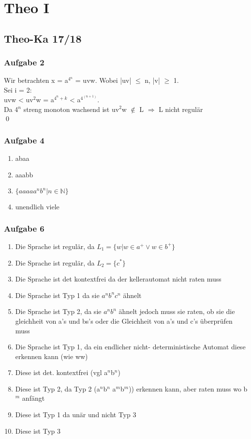 \documentclass[12pt]{scrartcl}
\begin{document}
	
\section{Theo I}
\subsection{Theo-Ka 17/18}
	
\subsubsection{Aufgabe 2}
	Wir betrachten x = a$^{4{^n}}$ = uvw. Wobei |uv| $\le$ n, |v| $\ge$ 1. \\
	Sei i = 2:\\
	uvw < uv$^{2}$w = a$^{4^{n}+k}$ <  a$^{4^{(n+1)}}$. \\
	Da 4$^{n}$ streng monoton wachsend ist uv$^{2}$w $\notin$ L $\Rightarrow$ L nicht regulär \\
	\qed
\subsubsection{Aufgabe 4}
	\begin{enumerate}
		\item abaa
		\item aaabb
		\item \(\{aaaaa^{n}b^{n}|n\in \mathbb{N}\}\)
		\item unendlich viele 
	\end{enumerate}
\subsubsection{Aufgabe 6}
	\begin{enumerate}
	
		\item Die Sprache ist regulär, da \(L_1 = \{w | w \in a^{+} \lor w \in b^{+} \} \)
		\item Die Sprache ist regulär, da \( L_2 = \{c^{*} \} \)
		\item Die Sprache ist det kontextfrei da der kellerautomat nicht raten muss 
		\item Die Sprache ist Typ 1 da sie \( a^{n} b^{n} c^{n} \) ähnelt
		\item Die Sprache ist Typ 2, da sie \(a^{n} b^{n} \) ähnelt jedoch muss sie raten, ob sie die gleichheit von a's und  bs's oder die Gleichheit von a's und c's überprüfen muss
		\item Die Sprache ist Typ 1, da ein endlicher nicht- deterministische Automat diese erkennen kann (wie ww)
		\item Diese ist det. kontextfrei (vgl a$^{n}$b$^{n}$)
		\item Diese ist Typ 2, da Typ 2 (a$^{n}$b$^{n}$ a$^{m}$b$^{m}$)) erkennen kann, aber raten muss wo b$^{m}$ anfängt
		\item Diese ist Typ 1 da unär und nicht Typ 3
		\item Diese ist Typ 3
	\end{enumerate}
\end{document}
